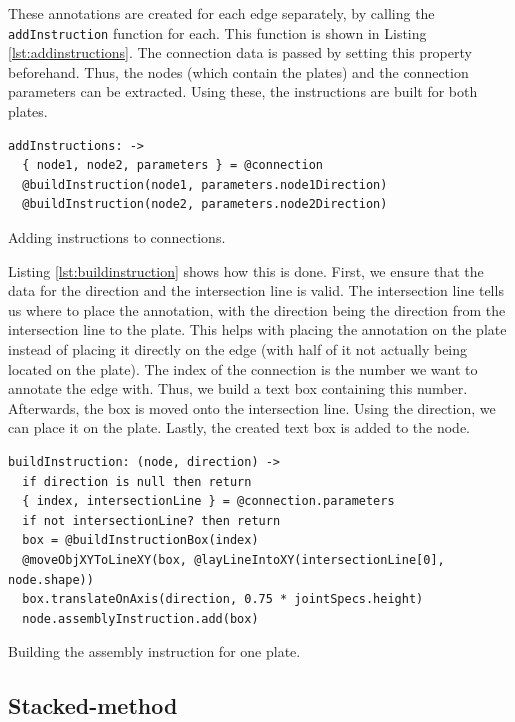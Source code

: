 \documentclass[../ClassicThesis.tex]{subfiles}
\begin{document}
These annotations are created for each edge separately, by calling the \texttt{addInstruction} function for each. This function is shown in Listing \ref{lst:addinstructions}. The connection data is passed by setting this property beforehand. Thus, the nodes (which contain the plates) and the connection parameters can be extracted. Using these, the instructions are built for both plates.

\begin{listing}
\begin{verbatim}
addInstructions: ->
  { node1, node2, parameters } = @connection
  @buildInstruction(node1, parameters.node1Direction)
  @buildInstruction(node2, parameters.node2Direction)
\end{verbatim}
\caption{Adding instructions to connections.}
\label{lst:addinstructions}
\end{listing}

Listing \ref{lst:buildinstruction} shows how this is done. First, we ensure that the data for the direction and the intersection line is valid. The intersection line tells us where to place the annotation, with the direction being the direction from the intersection line to the plate. This helps with placing the annotation on the plate instead of placing it directly on the edge (with half of it not actually being located on the plate). The index of the connection is the number we want to annotate the edge with. Thus, we build a text box containing this number. Afterwards, the box is moved onto the intersection line. Using the direction, we can place it on the plate. Lastly, the created text box is added to the node.

\begin{listing}
\begin{verbatim}
buildInstruction: (node, direction) ->
  if direction is null then return
  { index, intersectionLine } = @connection.parameters
  if not intersectionLine? then return 
  box = @buildInstructionBox(index)
  @moveObjXYToLineXY(box, @layLineIntoXY(intersectionLine[0], node.shape))
  box.translateOnAxis(direction, 0.75 * jointSpecs.height)
  node.assemblyInstruction.add(box)
\end{verbatim}
\caption{Building the assembly instruction for one plate.}
\label{lst:buildinstruction}
\end{listing}

\subsection{Stacked-method}\label{sub:assemblystacked}
\end{document}
